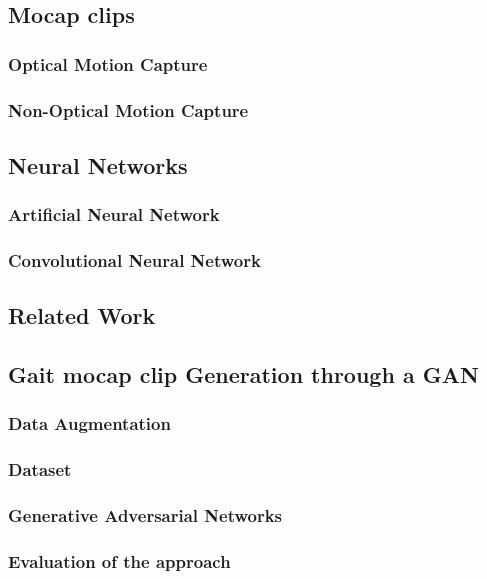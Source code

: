 \documentclass[12pt,oneside,a4paper,english]{article}
\begin{document}
\subsection{Mocap clips}
 
\subsubsection{Optical Motion Capture}
 
\subsubsection{Non-Optical Motion Capture}
 
\subsection{Neural Networks}
\subsubsection{Artificial Neural Network}
 
\subsubsection{Convolutional Neural Network}

\subsection{Related Work}
 
\subsection{Gait mocap clip Generation through a GAN}

\subsubsection{Data Augmentation}

\subsubsection{Dataset}

\subsubsection{Generative Adversarial Networks}

\subsubsection{Evaluation of the approach}

\end{document}
